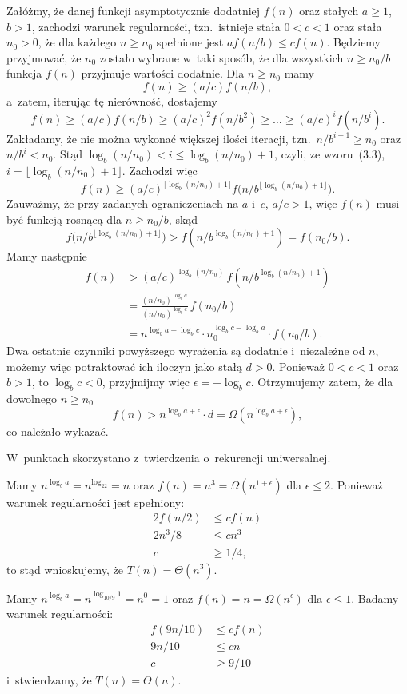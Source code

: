 \noindent Załóżmy, że danej funkcji asymptotycznie dodatniej $f(n)$ oraz stałych $a\ge1$, $b>1$, zachodzi warunek regularności, tzn.\ istnieje stała $0<c<1$ oraz stała $n_0>0$, że dla każdego $n\ge n_0$ spełnione jest $af(n/b)\le cf(n)$. Będziemy przyjmować, że $n_0$ zostało wybrane w~taki sposób, że dla wszystkich $n\ge n_0/b$ funkcja $f(n)$ przyjmuje wartości dodatnie. Dla $n\ge n_0$ mamy
\[
	f(n) \ge (a/c)f(n/b),
\]
a~zatem, iterując tę nierówność, dostajemy
\[
	f(n) \ge (a/c)f(n/b) \ge (a/c)^2f(n/b^2) \ge \dots \ge (a/c)^if(n/b^i).
\]
Zakładamy, że nie można wykonać większej ilości iteracji, tzn.\ $n/b^{i-1}\ge n_0$ oraz $n/b^i<n_0$. Stąd $\log_b(n/n_0)<i\le\log_b(n/n_0)+1$, czyli, ze wzoru~(3.3), $i=\lfloor\log_b(n/n_0)+1\rfloor$. Zachodzi więc
\[
	f(n) \ge (a/c)^{\lfloor\log_b(n/n_0)+1\rfloor}f\bigl(n/b^{\lfloor\log_b(n/n_0)+1\rfloor}\bigr).
\]
Zauważmy, że przy zadanych ograniczeniach na $a$ i~$c$, $a/c>1$, więc $f(n)$ musi być funkcją rosnącą dla $n\ge n_0/b$, skąd
\[
	f\bigl(n/b^{\lfloor\log_b(n/n_0)+1\rfloor}\bigr) > f(n/b^{\log_b(n/n_0)+1}) = f(n_0/b).
\]
Mamy następnie
\begin{align*}
	f(n) &> (a/c)^{\log_b(n/n_0)}\,f(n/b^{\log_b(n/n_0)+1}) \\[1mm]
	&= \frac{(n/n_0)^{\log_ba}}{(n/n_0)^{\log_bc}}\,f(n_0/b) \\[1mm]
	&= n^{\log_ba-\log_bc}\cdot n_0^{\log_bc-\log_ba}\cdot f(n_0/b).
\end{align*}
Dwa ostatnie czynniki powyższego wyrażenia są dodatnie i~niezależne od $n$, możemy więc potraktować ich iloczyn jako stałą $d>0$. Ponieważ $0<c<1$ oraz $b>1$, to $\log_bc<0$, przyjmijmy więc $\epsilon=-\log_bc$. Otrzymujemy zatem, że dla dowolnego $n\ge n_0$
\[
	f(n) > n^{\log_ba+\epsilon}\cdot d = \Omega(n^{\log_ba+\epsilon}),
\]
co należało wykazać.

\problems

W~punktach  skorzystano z~twierdzenia o~rekurencji uniwersalnej.

\subproblem %
Mamy $n^{\log_ba}=n^{\log_22}=n$ oraz $f(n)=n^3=\Omega(n^{1+\epsilon})$ dla $\epsilon\le2$. Ponieważ warunek regularności jest spełniony:
\begin{align*}
	2f(n/2) &\le cf(n) \\
	2n^3\!/8 &\le cn^3 \\
	c &\ge 1/4,
\end{align*}
to stąd wnioskujemy, że $T(n)=\Theta(n^3)$.

\subproblem %
Mamy $n^{\log_ba}=n^{\log_{10/9}1}=n^0=1$ oraz $f(n)=n=\Omega(n^\epsilon)$ dla $\epsilon\le1$. Badamy warunek regularności:
\begin{align*}
	f(9n/10) &\le cf(n) \\
	9n/10 &\le cn \\
	c &\ge 9/10
\end{align*}
i~stwierdzamy, że $T(n)=\Theta(n)$.

